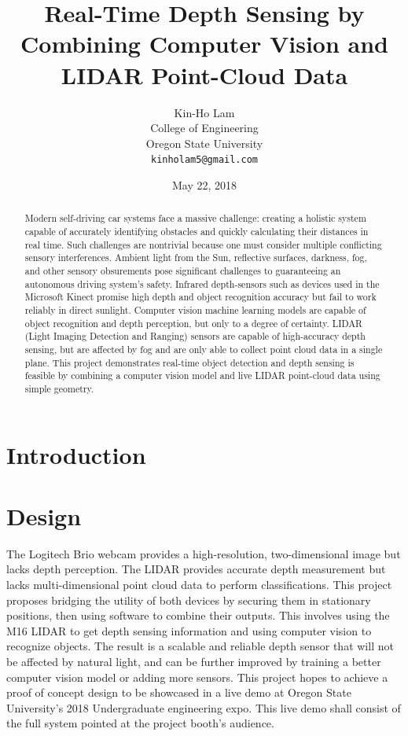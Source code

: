 \documentclass{article}
\title{Real-Time Depth Sensing by Combining Computer Vision and LIDAR Point-Cloud Data}
\date{May 22, 2018}
\author{
  Kin-Ho Lam\\
  College of Engineering\\
  Oregon State University \\
  \texttt{kinholam5@gmail.com}\\
}
\begin{document}
\maketitle

\begin{abstract}
  Modern self-driving car systems face a massive challenge: creating a holistic system capable of accurately identifying obstacles and quickly calculating their distances in real time.
  Such challenges are nontrivial because one must consider multiple conflicting sensory interferences.
  Ambient light from the Sun, reflective surfaces, darkness, fog, and other sensory obsurements pose significant challenges to guaranteeing an autonomous driving system's safety.
  Infrared depth-sensors such as devices used in the Microsoft Kinect promise high depth and object recognition accuracy but fail to work reliably in direct sunlight.
  Computer vision machine learning models are capable of object recognition and depth perception, but only to a degree of certainty.
  LIDAR (Light Imaging Detection and Ranging) sensors are capable of high-accuracy depth sensing, but are affected by fog and are only able to collect point cloud data in a single plane.
  This project demonstrates real-time object detection and depth sensing is feasible by combining a computer vision model and live LIDAR point-cloud data using simple geometry.
\end{abstract}


\section{Introduction}
    

\section{Design}
\label{sec:Design}
    The Logitech Brio webcam provides a high-resolution, two-dimensional image but lacks depth perception.
		The LIDAR provides accurate depth measurement but lacks multi-dimensional point cloud data to perform classifications.
		This project proposes bridging the utility of both devices by securing them in stationary positions, then using software to combine their outputs.
		This involves using the M16 LIDAR to get depth sensing information and using computer vision to recognize objects.
		The result is a scalable and reliable depth sensor that will not be affected by natural light, and can be further improved by training a better computer vision model or adding more sensors.
		This project hopes to achieve a proof of concept design to be showcased in a live demo at Oregon State University's 2018 Undergraduate engineering expo.			
		This live demo shall consist of the full system pointed at the project booth's audience. 
\end{document}
